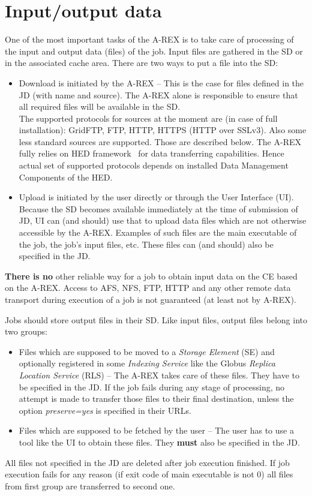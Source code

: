 \documentclass{article}                            %
\begin{document}
\section{Input/output data\label{sec:input/output data}}

One of the most important tasks of the A-REX is to take care of processing of the
input and output data (files) of the job. Input files are gathered
in the SD or in the associated cache area. There are two ways to put a file
into the SD:

\begin{itemize}
\item Download is initiated by the A-REX -- This is the case for files defined
in the JD (with name and source). The A-REX alone is responsible to
ensure that all required files will be available in the SD.\\
The supported protocols for sources at the moment are (in case of
full installation): GridFTP, FTP, HTTP, HTTPS (HTTP over SSLv3). Also
some less standard sources are supported. Those are described below.
The A-REX fully relies on HED framework~\cite{hed} for data transferring
capabilities. Hence actual set of supported protocols depends on installed
Data Management Components of the HED.
\item Upload is initiated by the user directly or through the User Interface
(UI). Because the SD becomes available immediately at the time of
submission of JD, UI can (and should) use that to upload data files
which are not otherwise accessible by the A-REX. Examples of such
files are the main executable of the job, the job's input files, etc.
These files can (and should) also be specified in the JD.
\end{itemize}
\textbf{There is no} other reliable way for a job to obtain input
data on the CE based on the A-REX. Access to AFS, NFS, FTP, HTTP and
any other remote data transport during execution of a job is not guaranteed
(at least not by A-REX).

Jobs should store output files in their SD. Like input files, output
files belong into two groups:

\begin{itemize}
\item Files which are supposed to be moved to a \emph{Storage Element} (SE)
and optionally registered in some \emph{Indexing Service} like the
Globus \emph{Replica Location Service} (RLS) -- The A-REX takes care
of these files. They have to be specified in the JD. If the job fails
during any stage of processing, no attempt is made to transfer those
files to their final destination, unless the option \emph{preserve=yes}
is specified in their URLs.
\item Files which are supposed to be fetched by the user -- The user has
to use a tool like the UI to obtain these files. They \textbf{must}
also be specified in the JD.
\end{itemize}
All files not specified in the JD are deleted after job execution
finished. If job execution fails for any reason (if exit code of main
executable is not 0) all files from first group are transferred to
second one.
\end{document}
